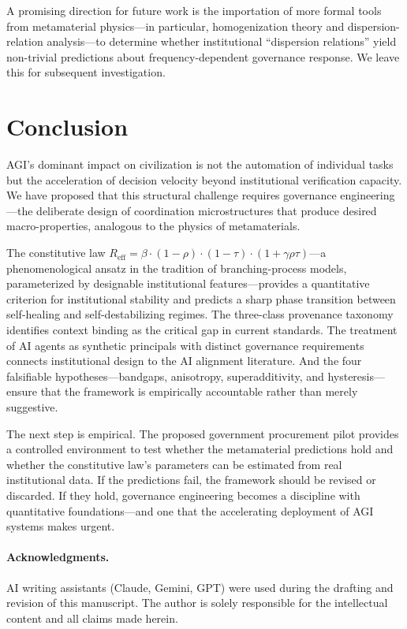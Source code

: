 \documentclass[runningheads]{llncs}
\begin{document}
A promising direction for future work is the importation of more formal tools from metamaterial physics---in particular, homogenization theory and dispersion-relation analysis---to determine whether institutional ``dispersion relations'' yield non-trivial predictions about frequency-dependent governance response. We leave this for subsequent investigation.


\section{Conclusion}
\label{sec:conclusion}

AGI's dominant impact on civilization is not the automation of individual tasks but the acceleration of decision velocity beyond institutional verification capacity. We have proposed that this structural challenge requires governance engineering---the deliberate design of coordination microstructures that produce desired macro-properties, analogous to the physics of metamaterials.

The constitutive law $R_{\mathrm{eff}} = \beta \cdot (1-\rho) \cdot (1-\tau) \cdot (1+\gamma \rho \tau)$---a phenomenological ansatz in the tradition of branching-process models, parameterized by designable institutional features---provides a quantitative criterion for institutional stability and predicts a sharp phase transition between self-healing and self-destabilizing regimes. The three-class provenance taxonomy identifies context binding as the critical gap in current standards. The treatment of AI agents as synthetic principals with distinct governance requirements connects institutional design to the AI alignment literature. And the four falsifiable hypotheses---bandgaps, anisotropy, superadditivity, and hysteresis---ensure that the framework is empirically accountable rather than merely suggestive.

The next step is empirical. The proposed government procurement pilot provides a controlled environment to test whether the metamaterial predictions hold and whether the constitutive law's parameters can be estimated from real institutional data. If the predictions fail, the framework should be revised or discarded. If they hold, governance engineering becomes a discipline with quantitative foundations---and one that the accelerating deployment of AGI systems makes urgent.

\paragraph{Acknowledgments.} AI writing assistants (Claude, Gemini, GPT) were used during the drafting and revision of this manuscript. The author is solely responsible for the intellectual content and all claims made herein.



\end{document}
